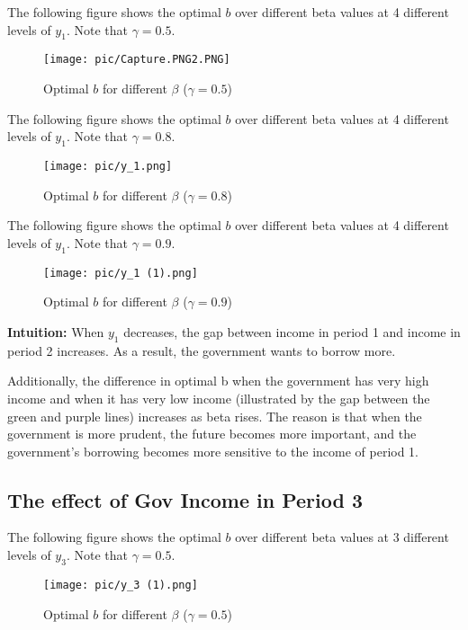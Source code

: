 \documentclass{article}
\begin{document}
The following figure shows the optimal $b$ over different beta values at 4 different levels of $y_1$. Note that $\gamma = 0.5$.

\begin{figure}[H]
\centering
{\texttt{[image: pic/Capture.PNG2.PNG]}}
\caption{Optimal $b$ for different $\beta$ ($\gamma = 0.5$)}
\end{figure}

The following figure shows the optimal $b$ over different beta values at 4 different levels of $y_1$. Note that $\gamma = 0.8$.

\begin{figure}[H]
\centering
{\texttt{[image: pic/y\_1.png]}}
\caption{Optimal $b$ for different $\beta$ ($\gamma = 0.8$)}
\end{figure}

The following figure shows the optimal $b$ over different beta values at 4 different levels of $y_1$. Note that $\gamma = 0.9$.

\begin{figure}[H]
\centering
{\texttt{[image: pic/y\_1 (1).png]}}
\caption{Optimal $b$ for different $\beta$ ($\gamma = 0.9$)}
\end{figure}

\textbf{Intuition:} When $y_1$ decreases, the gap between income in period 1 and income in period 2 increases. As a result, the government wants to borrow more.

Additionally, the difference in optimal b when the government has very high income and when it has very low income (illustrated by the gap between the green and purple lines) increases as beta rises. The reason is that when the government is more prudent, the future becomes more important, and the government's borrowing becomes more sensitive to the income of period 1.

\subsection{The effect of Gov Income in Period 3}

The following figure shows the optimal $b$ over different beta values at 3 different levels of $y_3$. Note that $\gamma = 0.5$.

\begin{figure}[H]
\centering
{\texttt{[image: pic/y\_3 (1).png]}}
\caption{Optimal $b$ for different $\beta$ ($\gamma = 0.5$)}
\end{figure}
\end{document}
